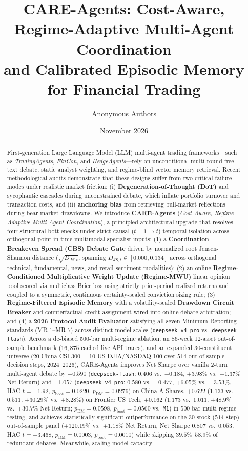 \documentclass[10pt,a4paper,twocolumn]{article}
\title{\vspace{-8mm}\textbf{\Large CARE-Agents: Cost-Aware, Regime-Adaptive Multi-Agent Coordination\\and Calibrated Episodic Memory for Financial Trading}}
\author{Anonymous Authors}
\date{\vspace{-3mm}\small November 2026}
\begin{document}
\maketitle

\begin{abstract}
\noindent
First-generation Large Language Model (LLM) multi-agent trading frameworks---such as \textit{TradingAgents}, \textit{FinCon}, and \textit{HedgeAgents}---rely on unconditional multi-round free-text debate, static analyst weighting, and regime-blind vector memory retrieval. Recent methodological audits demonstrate that these designs suffer from two critical failure modes under realistic market friction: (i) \textbf{Degeneration-of-Thought (DoT)} and sycophantic cascades during unconstrained debate, which inflate portfolio turnover and transaction costs, and (ii) \textbf{anchoring bias} from retrieving bull-market reflections during bear-market drawdowns. We introduce \textbf{CARE-Agents} (\textit{Cost-Aware, Regime-Adaptive Multi-Agent Coordination}), a principled architectural upgrade that resolves four structural bottlenecks under strict causal ($t-1 \to t$) temporal isolation across orthogonal point-in-time multimodal specialist inputs: (1) a \textbf{Coordination Breakeven Spread (CBS) Debate Gate} driven by normalized root Jensen-Shannon distance ($\sqrt{D_{JS,t}}$, spanning $D_{JS,t} \in [0.000, 0.134]$ across orthogonal technical, fundamental, news, and retail-sentiment modalities); (2) an online \textbf{Regime-Conditioned Multiplicative Weight Update (Regime-MWU)} linear opinion pool scored via multiclass Brier loss using strictly prior-period realized returns and coupled to a symmetric, continuous certainty-scaled conviction sizing rule; (3) \textbf{Regime-Filtered Episodic Memory} with a volatility-scaled \textbf{Drawdown Circuit Breaker} and counterfactual credit assignment wired into online debate arbitration; and (4) a \textbf{2026 Protocol Audit Evaluator} satisfying all seven Minimum Reporting standards (MR-1--MR-7) across distinct model scales (\texttt{deepseek-v4-pro} vs.\ \texttt{deepseek-flash}). Across a de-biased 500-bar multi-regime ablation, an 86-week 12-asset out-of-sample benchmark ($16,875$ cached live API traces), and an expanded 30-constituent universe (20 China CSI 300 + 10 US DJIA/NASDAQ-100 over $514$ out-of-sample decision steps, 2024--2026), CARE-Agents improves Net Sharpe over vanilla 2-turn multi-agent debate by $+0.590$ (\texttt{deepseek-flash}: $0.406$ vs.\ $-0.184$, $+3.98\%$ vs.\ $-1.37\%$ Net Return) and $+1.057$ (\texttt{deepseek-v4-pro}: $0.580$ vs.\ $-0.477$, $+6.05\%$ vs.\ $-3.53\%$, HAC $t = +1.92$, $p_{\text{boot}} = 0.0220$, $p_{\text{DM}} = 0.0276$) on China A-Shares, $+0.622$ ($1.133$ vs.\ $0.511$, $+30.29\%$ vs.\ $+8.28\%$) on Frontier US Tech, $+0.162$ ($1.173$ vs.\ $1.011$, $+48.9\%$ vs.\ $+30.7\%$ Net Return; $p_{\text{DM}} = 0.0598$, $p_{\text{boot}} = 0.0560$ vs.\ \texttt{M1}) in 500-bar multi-regime testing, and achieves statistically significant outperformance on the 30-stock ($514$-step) out-of-sample panel ($+120.19\%$ vs.\ $+1.18\%$ Net Return, Net Sharpe $0.807$ vs.\ $0.053$, HAC $t = +3.468$, $p_{\text{DM}} = 0.0003$, $p_{\text{boot}} = 0.0010$) while skipping $39.5\%$--$58.9\%$ of redundant debates. Meanwhile, scaling model capacity 
\end{abstract}
\end{document}
